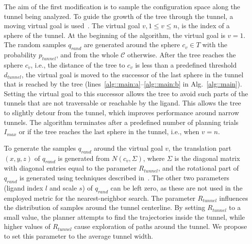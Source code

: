 \documentclass[usletter, 10pt, conference]{ieeeconf} %
\def\qrand{q_{rand}}
\def\C{\mathcal{C}}
\def\dt{d_{tunnel}}
\def\rv{R_{tunnel}}
\def\Imax{I_{max}} %
\def\gb{p_{tunnel}}
\begin{document}
The aim of the first modification is to sample the configuration space along the tunnel being analyzed.
To guide the growth of the tree through the tunnel, a moving virtual goal is used~\cite{vonasek2009rrt}.
The virtual goal $v, 1\le v \le n$, is the index of a sphere of the tunnel.
At the beginning of the algorithm, the virtual goal is $v=1$.
The random samples $\qrand$ are generated around the sphere $c_v \in T$ with the probability $\gb$, and from the whole $\C$ otherwise.
After the tree reaches the sphere $c_v$, i.e., the distance of the tree to $c_v$ is
less than a predefined threshold $\dt$, the virtual goal is moved to the successor of the last sphere in the tunnel
that is reached by the tree (lines~\ref{alg::main:a}--\ref{alg::main:b} in Alg.~\ref{alg::main}).
Setting the virtual goal to this successor allows the tree to avoid such parts of the tunnels that are not traversable or reachable by the ligand.
This allows the tree to slightly detour from the tunnel, which improves performance around narrow tunnels.
The algorithm terminates after a predefined number of planning trials $\Imax$ or if the tree reaches
the last sphere in the tunnel, i.e., when $v = n$.

To generate the samples $\qrand$ around the virtual goal $v$, the translation part $(x,y,z)$ of $\qrand$ is generated
from $N(c_v,\Sigma)$, where $\Sigma$ is the diagonal matrix with diagonal entries equal to the parameter $\rv$, and the rotational
part of $\qrand$ is generated using techniques described in~\cite{kuffnerES}.
The other two parameters (ligand index $l$ and scale $s$) of $\qrand$ can be left zero, as these are not used in the employed
metric for the nearest-neighbor search.
The parameter $\rv$ influences the distribution of samples around the tunnel centerline. 
By setting $\rv$ to a small value, the planner attempts to find the trajectories inside the tunnel, while higher values
of $\rv$ cause  exploration of paths around the tunnel.
We propose to set this parameter to the average tunnel width.
\end{document}
